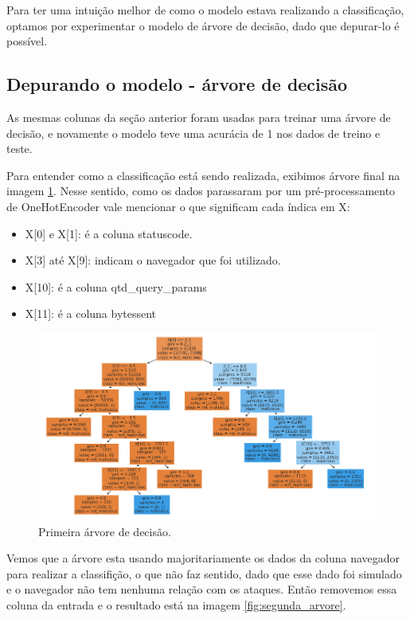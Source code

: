 Para ter uma intuição melhor de como o modelo estava realizando a classificação, optamos por experimentar 
o modelo de árvore de decisão, dado que depurar-lo é possível.

\subsection{Depurando o modelo - árvore de decisão}

As mesmas colunas da seção anterior foram usadas para treinar uma árvore de decisão, e novamente
o modelo teve uma acurácia de 1 nos dados de treino e teste. 

Para entender como a classificação está sendo realizada, exibimos árvore final na imagem \ref{fig:primeira_arvore}. Nesse sentido, 
como os dados parassaram por um pré-processamento de OneHotEncoder vale mencionar o que significam cada índica em X:

\begin{itemize}
    \item X[0] e X[1]: é a coluna statuscode.
    \item X[3] até X[9]: indicam o navegador que foi utilizado.
    \item X[10]: é a coluna qtd\_query\_params
    \item X[11]: é a coluna bytessent
\end{itemize}

\begin{figure}
    \centering
    \includegraphics[width=.9\textwidth]{figuras/primeira-arvore.png}
    \caption{Primeira árvore de decisão. \label{fig:primeira_arvore}}    
\end{figure}

Vemos que a árvore esta usando majoritariamente os dados da coluna navegador 
para realizar a classifição, o que não faz sentido, dado que esse dado foi simulado e o 
navegador não tem nenhuma relação com os ataques. Então removemos essa coluna da entrada 
e o resultado está na imagem \ref{fig:segunda_arvore}.


